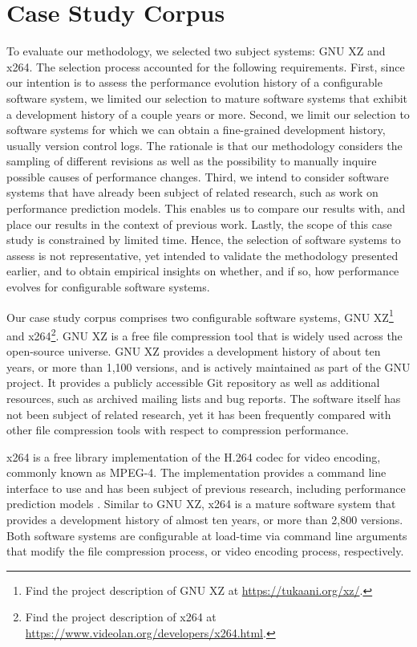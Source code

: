 \section{Case Study Corpus}\label{sec:casestudy}
To evaluate our methodology, we selected two subject systems: GNU XZ and
x264. The selection process accounted for the following requirements. First,
since our intention is to assess the performance evolution history of a
configurable software system, we limited our selection to mature software
systems that exhibit a development history of a couple years or more. Second,
we limit our selection to software systems for which we can obtain a
fine-grained development history, usually version control logs. The rationale is
that our methodology considers the sampling of different revisions as well as the possibility to manually inquire possible causes of performance
changes. Third, we intend to consider software systems that have already been
subject of related research, such as work on performance prediction models.
This enables us to compare our results with, and place our results in the
context of previous work. Lastly, the scope of this case study is constrained
by limited time. Hence, the selection of software systems to assess is not
representative, yet intended to validate the methodology presented earlier, and
to obtain empirical insights on whether, and if so, how performance evolves for
configurable software systems.

Our case study corpus comprises two configurable software systems, GNU
XZ\footnote{Find the project description of GNU XZ at
\url{https://tukaani.org/xz/}.} and x264\footnote{Find the project description
of x264 at \url{https://www.videolan.org/developers/x264.html}.}.
GNU XZ is a free file compression tool that is widely used across the open-source universe. GNU XZ provides a development history of about ten years,
or more than 1,100 versions,  and is actively maintained as part of the GNU
project. It provides a publicly accessible Git repository as well as additional
resources, such as archived mailing lists and bug reports. The software itself
has not been subject of related research, yet it has been frequently compared
with other file compression tools with respect to compression performance. 

x264 is a free library implementation of the H.264 codec for video encoding,
commonly known as MPEG-4. The implementation provides a command line interface
to use and has been subject of previous research, including performance
prediction models
\citep{siegmund_predicting_2012,siegmund_performance-influence_2015}. Similar to
GNU XZ, x264 is a mature software system that provides a development history of almost ten years, or more than 2,800 versions. Both software systems are configurable at load-time
via command line arguments that modify the file compression process, or video
encoding process, respectively.

